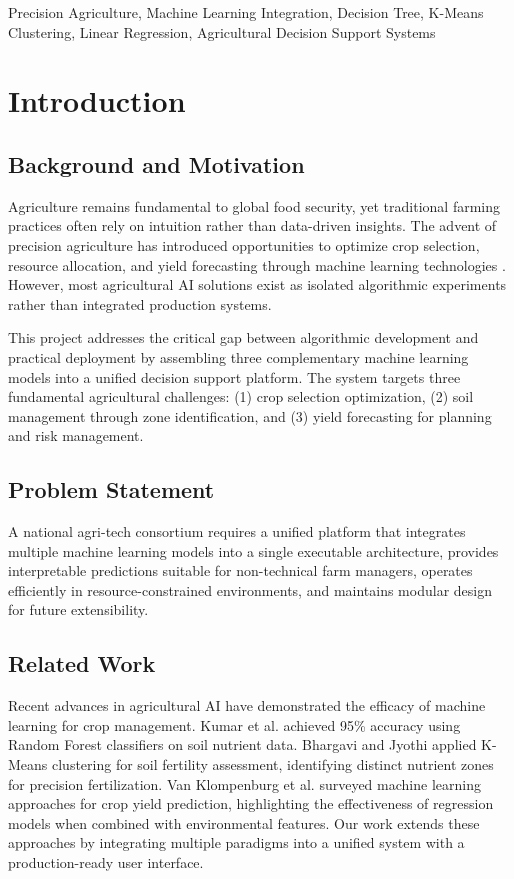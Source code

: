 \documentclass[conference]{IEEEtran}
\begin{document}
\begin{IEEEkeywords}
Precision Agriculture, Machine Learning Integration, Decision Tree, K-Means Clustering, Linear Regression, Agricultural Decision Support Systems
\end{IEEEkeywords}

\section{Introduction}

\subsection{Background and Motivation}
Agriculture remains fundamental to global food security, yet traditional farming practices often rely on intuition rather than data-driven insights. The advent of precision agriculture has introduced opportunities to optimize crop selection, resource allocation, and yield forecasting through machine learning technologies \cite{wolfert2017big}. However, most agricultural AI solutions exist as isolated algorithmic experiments rather than integrated production systems.

This project addresses the critical gap between algorithmic development and practical deployment by assembling three complementary machine learning models into a unified decision support platform. The system targets three fundamental agricultural challenges: (1) crop selection optimization, (2) soil management through zone identification, and (3) yield forecasting for planning and risk management.

\subsection{Problem Statement}
A national agri-tech consortium requires a unified platform that integrates multiple machine learning models into a single executable architecture, provides interpretable predictions suitable for non-technical farm managers, operates efficiently in resource-constrained environments, and maintains modular design for future extensibility.

\subsection{Related Work}
Recent advances in agricultural AI have demonstrated the efficacy of machine learning for crop management. Kumar et al. \cite{kumar2015crop} achieved 95\% accuracy using Random Forest classifiers on soil nutrient data. Bhargavi and Jyothi \cite{bhargavi2009applying} applied K-Means clustering for soil fertility assessment, identifying distinct nutrient zones for precision fertilization. Van Klompenburg et al. \cite{vanklompenburg2020crop} surveyed machine learning approaches for crop yield prediction, highlighting the effectiveness of regression models when combined with environmental features. Our work extends these approaches by integrating multiple paradigms into a unified system with a production-ready user interface.
\end{document}
